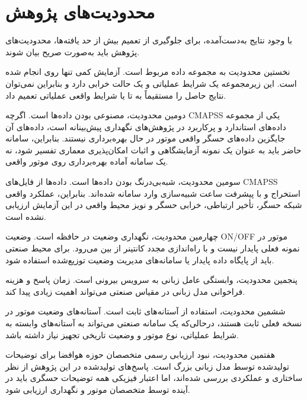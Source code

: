 \documentclass[a4paper,fleqn]{report}
\begin{document}
\section{محدودیت‌های پژوهش}
\label{sec:limitations-final}

با وجود نتایج به‌دست‌آمده، برای جلوگیری از تعمیم بیش از حد یافته‌ها، محدودیت‌های پژوهش باید به‌صورت صریح بیان شوند.

نخستین محدودیت به مجموعه داده مربوط است. آزمایش کمی تنها روی  انجام شده است. این زیرمجموعه یک شرایط عملیاتی و یک حالت خرابی دارد و بنابراین نمی‌توان نتایج حاصل را مستقیماً به  تا  یا شرایط واقعی عملیاتی تعمیم داد.

دومین محدودیت، مصنوعی بودن داده‌ها است. اگرچه \gls{CMAPSS} یکی از مجموعه داده‌های استاندارد و پرکاربرد در پژوهش‌های نگهداری پیش‌بینانه است، داده‌های آن جایگزین داده‌های حسگر واقعی موتور در حال بهره‌برداری نیستند. بنابراین، سامانه حاضر باید به عنوان یک نمونه آزمایشگاهی و اثبات امکان‌پذیری معماری تفسیر شود، نه یک سامانه آماده بهره‌برداری روی موتور واقعی.

سومین محدودیت، شبه‌بی‌درنگ بودن داده‌ها است. داده‌ها از فایل‌های CMAPSS استخراج و با پیشرفت ساعت شبیه‌سازی وارد سامانه شده‌اند. بنابراین، عملکرد واقعی شبکه حسگر، تأخیر ارتباطی، خرابی حسگر و نویز محیط واقعی در این آزمایش ارزیابی نشده است.

چهارمین محدودیت، نگهداری وضعیت در حافظه است. وضعیت ON/OFF موتور در نمونه فعلی پایدار نیست و با راه‌اندازی مجدد کانتینر از بین می‌رود. برای محیط صنعتی باید از پایگاه داده پایدار یا سامانه‌های مدیریت وضعیت توزیع‌شده استفاده شود.

پنجمین محدودیت، وابستگی عامل زبانی به سرویس بیرونی است. زمان پاسخ و هزینه فراخوانی مدل زبانی در مقیاس صنعتی می‌تواند اهمیت زیادی پیدا کند.

ششمین محدودیت، استفاده از آستانه‌های ثابت است. آستانه‌های وضعیت موتور در نسخه فعلی ثابت هستند، درحالی‌که یک سامانه صنعتی می‌تواند به آستانه‌های وابسته به شرایط عملیاتی، نوع موتور و وضعیت تاریخی تجهیز نیاز داشته باشد.

هفتمین محدودیت، نبود ارزیابی رسمی متخصصان حوزه هوافضا برای توضیحات تولیدشده توسط مدل زبانی بزرگ است. پاسخ‌های تولیدشده در این پژوهش از نظر ساختاری و عملکردی بررسی شده‌اند، اما اعتبار فیزیکی همه توضیحات حسگری باید در آینده توسط متخصصان موتور و نگهداری ارزیابی شود.
\end{document}
